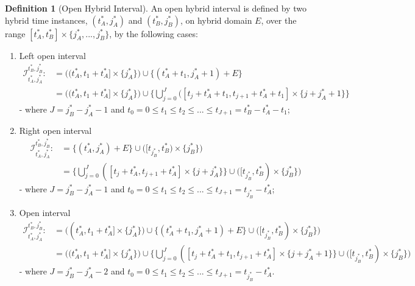 \documentclass{article}
\theoremstyle{definition}
\newtheorem{definition}{Definition}[section]
\begin{document}
\begin{definition}[Open Hybrid Interval]
An open hybrid interval is defined by two hybrid time instances,
$(t^*_A,j^*_A)$ and $(t^*_B,j^*_B)$, on hybrid domain $E$, over the
range $[t^*_A, t^*_B]\times\{j^*_A,..., j^*_B\}$, by the following cases:

\begin{enumerate}

    \item Left open interval
    \begin{align}
        \mathcal{I}^{t_B^*,j_B^*}_{t_A^*,j_A^*}:&= \bigg( (t^*_A, t_1 + t^*_A] \times \{j^*_A\} \bigg) \cup 
        \bigg\{ (t^*_A + t_1,j^*_A + 1) + E\bigg\} \\
        &= \bigg( (t^*_A, t_1 +
        t^*_A] \times \{j^*_A\} \bigg) \cup 
        \bigg\{ \bigcup\limits_{j=0}^{J}
            ([t_j+t^*_A+t_1,t_{j+1}+t^*_A+t_1] \times \{j+j^*_A+1\}\bigg
            \}\nonumber 
    \end{align}
    - where $J = j^*_B - j^*_A - 1$ and $t_0 = 0 \leq t_1 \leq t_2 \leq ... \leq
    t_{J+1} = t^*_B - t^*_A - t_1$;

    \item Right open interval
    \begin{align}
        \mathcal{I}^{t_B^*,j_B^*}_{t_A^*,j_A^*}:&=  \bigg\{(t^*_A,j^*_A) + E\bigg\} \cup \bigg(
        [t_{j^*_B}, t^*_B) \times \{j^*_B\}\bigg)\\
        &= \bigg\{ \bigcup\limits_{j=0}^{J} ([t_j+t^*_A,t_{j+1}+t^*_A]
            \times \{j+j^*_A\}\bigg\} 
                         \cup \bigg(
                            [t_{j^*_B}, t^*_B) \times
                        \{j^*_B\}\bigg)\nonumber
    \end{align}
    - where $J = j^*_B - j^*_A - 1$ and $t_0 = 0 \leq t_1 \leq t_2 \leq ...
    \leq t_{J+1} = t_{j^*_B} - t^*_A$; 


    \item Open interval
     \begin{align}
        \mathcal{I}^{t_B^*,j_B^*}_{t_A^*,j_A^*} :&=  \bigg( (t^*_A, t_1 + t^*_A] \times \{j^*_A\} \bigg) \cup
        \bigg\{ (t^*_A + t_1,j^*_A + 1) + E\bigg\}
        \cup \bigg( [t_{j^*_B}, t^*_B) \times \{j^*_B\}\bigg) \\
        &=  
        \bigg( (t^*_A, t_1 + t^*_A] \times \{j^*_A\} \bigg) \cup
        \bigg\{ \bigcup\limits_{j=0}^{J} ([t_j+t^*_A+t_1,t_{j+1}+t^*_A] \times
            \{j+j^*_A+1\} \bigg\}
        \cup \bigg( [t_{j^*_B}, t^*_B) \times \{j^*_B\}\bigg) \nonumber 
     \end{align}
    - where $J = j^*_B - j^*_A -2$ and $t_0 = 0 \leq t_1 \leq t_2 \leq ...
    \leq t_{J+1} = t_{j^*_B} - t^*_A$. 


\end{enumerate}
\end{definition}
\end{document}

